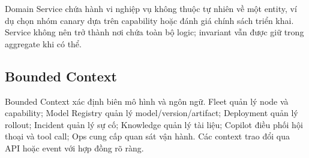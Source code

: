 Domain Service chứa hành vi nghiệp vụ không thuộc tự nhiên về một entity, ví dụ
chọn nhóm canary dựa trên capability hoặc đánh giá chính sách triển khai. Service
không nên trở thành nơi chứa toàn bộ logic; invariant vẫn được giữ trong aggregate
khi có thể.

\subsection{Bounded Context}

Bounded Context xác định biên mô hình và ngôn ngữ. Fleet quản lý node và
capability; Model Registry quản lý model/version/artifact; Deployment quản lý
rollout; Incident quản lý sự cố; Knowledge quản lý tài liệu; Copilot điều phối hội
thoại và tool call; Ops cung cấp quan sát vận hành. Các context trao đổi qua API
hoặc event với hợp đồng rõ ràng.